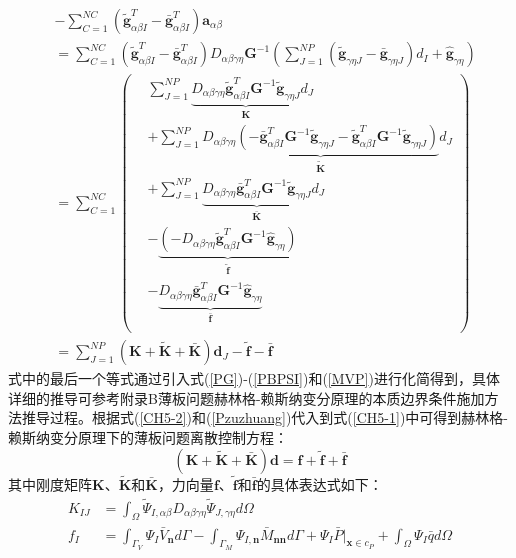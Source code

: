 \begin{equation}
\begin{split}\label{Pzuzhuang}
    &-\sum_{C=1}^{N\!C}(\tilde{\pmb g}_{\alpha\beta I}^T-\bar{\pmb g}_{\alpha\beta I}^T)\pmb a_{\alpha\beta}\\
    &=\sum_{C=1}^{N\!C}(\tilde{\pmb g}_{\alpha\beta I}^T-\bar{\pmb g}_{\alpha\beta I}^T)D_{\alpha\beta\gamma\eta}\pmb{G}^{-1}(\sum_{J=1}^{N\!P}(\tilde{\pmb g}_{\gamma\eta J}-\bar{\pmb g}_{\gamma\eta J})d_I+\hat{\pmb g}_{\gamma\eta})\\
    &=\sum_{C=1}^{N\!C}
    \left(\begin{split}
    &\sum_{J=1}^{N\!P}\underbrace{D_{\alpha\beta\gamma\eta}\tilde{\pmb g}_{\alpha\beta I}^T\pmb G^{-1}\tilde{\pmb g}_{\gamma\eta J}}_{\pmb{K}}d_J\\
    &+\sum_{J=1}^{N\!P}\underbrace{D_{\alpha\beta\gamma\eta}(-\bar{\pmb g}_{\alpha\beta I}^T\pmb G^{-1}\tilde{\pmb g}_{\gamma\eta J}-\tilde{\pmb g}_{\alpha\beta I}^T\pmb G^{-1}\tilde{\pmb g}_{\gamma\eta J})}_{\tilde{\pmb K}}d_J\\
    &+\sum_{J=1}^{N\!P}\underbrace{D_{\alpha\beta\gamma\eta}\bar{\pmb g}_{\alpha\beta I}^T\pmb G^{-1}\tilde{\pmb g}_{\gamma\eta J}}_{\bar{\pmb K}}d_J\\
    &-\underbrace{(-D_{\alpha\beta\gamma\eta}\tilde{\pmb g}_{\alpha\beta I}^T\pmb G^{-1}\hat{\pmb g}_{\gamma\eta })}_{\tilde{\pmb f}}\\
    &-\underbrace{D_{\alpha\beta\gamma\eta}\bar{\pmb g}_{\alpha\beta I}^T\pmb G^{-1}\hat{\pmb g}_{\gamma\eta }}_{\bar{\pmb f}}\\
    \end{split}\right)\\
    &=\sum_{J=1}^{N\!P}(\pmb{K}+\tilde{\pmb{K}}+\bar{\pmb{K}})\pmb d_J-\tilde{\pmb f}-\bar{\pmb f}
\end{split}
\end{equation}
式中的最后一个等式通过引入式(\ref{PG})-(\ref{PBPSI})和(\ref{MVP})进行化简得到，具体详细的推导可参考附录B薄板问题赫林格-赖斯纳变分原理的本质边界条件施加方法推导过程。根据式(\ref{CH5-2})和(\ref{Pzuzhuang})代入到式(\ref{CH5-1})中可得到赫林格-赖斯纳变分原理下的薄板问题离散控制方程：
\begin{equation}\label{equationP}
    (\pmb{K}+\tilde{\pmb K}+\bar{\pmb K})\pmb{d}=\pmb{f}+\tilde{\pmb f}+\bar{\pmb f}
\end{equation}
其中刚度矩阵$\pmb K$、$\tilde{\pmb K}$和$\bar{\pmb K}$，力向量$\pmb f$、$\tilde{\pmb f}$和$\bar{\pmb f}$的具体表达式如下：
\begin{subequations}\label{PHR1}
\begin{align}
    \label{PHR11}K_{IJ}&=\int_{\Omega}\tilde{\Psi}_{I,\alpha\beta}D_{\alpha\beta\gamma\eta}\tilde{\Psi}_{J,\gamma\eta}d\Omega \\
    \label{PHR12}f_I&=\int_{\Gamma_V}\Psi_I\bar{V}_{\pmb{n}}d\Gamma-\int_{\Gamma_M}\Psi_{I,\pmb{n}}\bar{M}_{\pmb{nn}}d\Gamma+\Psi_I\bar{P}\vert_{\pmb{x}\in c_P}+\int_{\Omega}\Psi_I\bar{q}d\Omega
\end{align}
\end{subequations}
